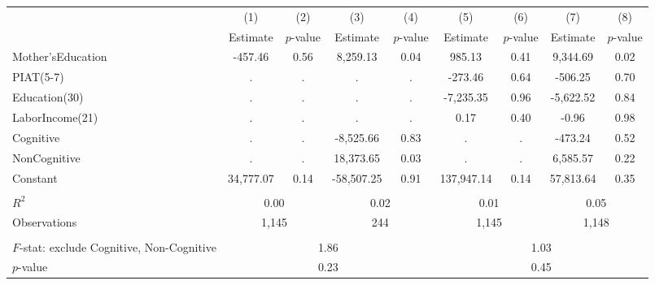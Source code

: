 \begin{tabular}{lcccccccc} \toprule
 & (1) & (2) & (3) & (4) & (5) & (6) & (7) & (8) \\
 & Estimate & $p$-value & Estimate & $p$-value  & Estimate & $p$-value  & Estimate & $p$-value  \\ \midrule 
Mother'sEducation &      -457.46 &         0.56 &     8,259.13 &         0.04 &       985.13 &         0.41 &     9,344.69 &         0.02 \\  
PIAT(5-7) &            . &            . &            . &            . &      -273.46 &         0.64 &      -506.25 &         0.70 \\  
Education(30) &            . &            . &            . &            . &    -7,235.35 &         0.96 &    -5,622.52 &         0.84 \\  
LaborIncome(21) &            . &            . &            . &            . &         0.17 &         0.40 &        -0.96 &         0.98 \\  
Cognitive &            . &            . &    -8,525.66 &         0.83 &            . &            . &      -473.24 &         0.52 \\  
NonCognitive &            . &            . &    18,373.65 &         0.03 &            . &            . &     6,585.57 &         0.22 \\  
Constant &    34,777.07 &         0.14 &   -58,507.25 &         0.91 &   137,947.14 &         0.14 &    57,813.64 &         0.35 \\  \\ \midrule
$R^2$ &         \multicolumn{2}{c}{0.00} &               \multicolumn{2}{c}{0.02} &                \multicolumn{2}{c}{0.01} &             \multicolumn{2}{c}{0.05}   \\  
Observations &       \multicolumn{2}{c}{1,145} &              \multicolumn{2}{c}{244}  &       \multicolumn{2}{c}{1,145} &      \multicolumn{2}{c}{1,148}   \\  \\ \midrule
$F$-stat: exclude Cognitive, Non-Cognitive &                \multicolumn{4}{c}{1.86} &                 \multicolumn{4}{c}{1.03}   \\  
$p$-value  &                \multicolumn{4}{c}{0.23} &                \multicolumn{4}{c}{0.45}    \\  \bottomrule \end{tabular}

